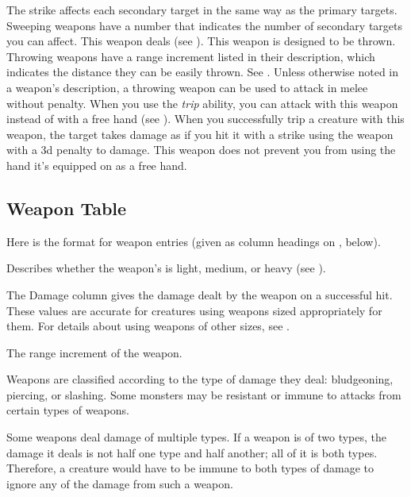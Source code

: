             The strike affects each secondary target in the same way as the primary targets.
            Sweeping weapons have a number that indicates the number of secondary targets you can affect.
             This weapon deals  (see ).
             This weapon is designed to be thrown. Throwing weapons have a range increment listed in their description, which indicates the distance they can be easily thrown. See .
            Unless otherwise noted in a weapon's description, a throwing weapon can be used to attack in melee without penalty.
             When you use the \textit{trip} ability, you can attack with this weapon instead of with a free hand (see ).
            When you successfully trip a creature with this weapon, the target takes damage as if you hit it with a strike using the weapon with a \minus3d penalty to damage.
             This weapon does not prevent you from using the hand it's equipped on as a free hand.

    \subsection{Weapon Table}
        Here is the format for weapon entries (given as column headings on , below).

         Describes whether the weapon's  is light, medium, or heavy (see ).

         The Damage column gives the damage dealt by the weapon on a successful hit.
        These values are accurate for creatures using weapons sized appropriately for them.
        For details about using weapons of other sizes, see .

         The range increment of the weapon.

         Weapons are classified according to the type of damage they deal: bludgeoning, piercing, or slashing. Some monsters may be resistant or immune to attacks from certain types of weapons.

        Some weapons deal damage of multiple types. If a weapon is of two types, the damage it deals is not half one type and half another; all of it is both types. Therefore, a creature would have to be immune to both types of damage to ignore any of the damage from such a weapon.

